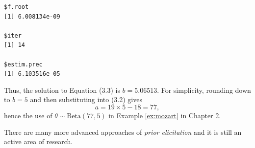 {\begin{verbatim}
$f.root
[1] 6.008134e-09

$iter
[1] 14

$estim.prec
[1] 6.103516e-05
\end{verbatim}















Thus, the solution to Equation (3.3) is $b=5.06513$.  For simplicity, rounding down to $b=5$ and then substituting into (3.2) gives
$$
a = 19 \times 5 -18 = 77,
$$
hence the use of $\theta \sim \text{Beta}(77,5)$ in Example \ref{ex:mozart} in Chapter 2.}

There are many more advanced approaches of \emph{prior elicitation} and it is still an active area of research.

\clearpage



















































































